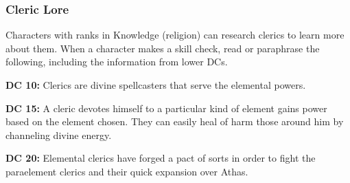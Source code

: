 \subsubsection{Cleric Lore}

Characters with ranks in Knowledge (religion) can research clerics to learn more about them. When a character makes a skill check, read or paraphrase the following, including the information from lower DCs.

\textbf{DC 10:} Clerics are divine spellcasters that serve the elemental powers.

\textbf{DC 15:} A cleric devotes himself to a particular kind of element gains power based on the element chosen. They can easily heal of harm those around him by channeling divine energy.

\textbf{DC 20:} Elemental clerics have forged a pact of sorts in order to fight the paraelement clerics and their quick expansion over Athas.
